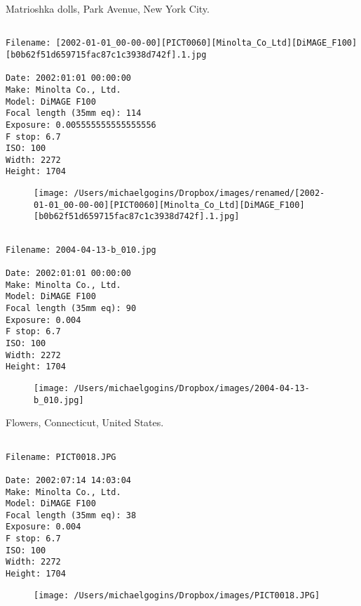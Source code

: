 \clearpage
\onecolumn
\noindent Matrioshka dolls, Park Avenue, New York City.
\noindent
\begin{lstlisting}

Filename: [2002-01-01_00-00-00][PICT0060][Minolta_Co_Ltd][DiMAGE_F100][b0b62f51d659715fac87c1c3938d742f].1.jpg

Date: 2002:01:01 00:00:00
Make: Minolta Co., Ltd.
Model: DiMAGE F100
Focal length (35mm eq): 114
Exposure: 0.005555555555555556
F stop: 6.7
ISO: 100
Width: 2272
Height: 1704
\end{lstlisting}
\clearpage

\begin{figure}
\texttt{[image: /Users/michaelgogins/Dropbox/images/renamed/[2002-01-01\_00-00-00][PICT0060][Minolta\_Co\_Ltd][DiMAGE\_F100][b0b62f51d659715fac87c1c3938d742f].1.jpg]}
\end{figure}
    
\clearpage
\onecolumn
\noindent 
\noindent
\begin{lstlisting}

Filename: 2004-04-13-b_010.jpg

Date: 2002:01:01 00:00:00
Make: Minolta Co., Ltd.
Model: DiMAGE F100
Focal length (35mm eq): 90
Exposure: 0.004
F stop: 6.7
ISO: 100
Width: 2272
Height: 1704
\end{lstlisting}
\clearpage

\begin{figure}
\texttt{[image: /Users/michaelgogins/Dropbox/images/2004-04-13-b\_010.jpg]}
\end{figure}
    
\clearpage
\onecolumn
\noindent Flowers, Connecticut, United States.
\noindent
\begin{lstlisting}

Filename: PICT0018.JPG

Date: 2002:07:14 14:03:04
Make: Minolta Co., Ltd.
Model: DiMAGE F100
Focal length (35mm eq): 38
Exposure: 0.004
F stop: 6.7
ISO: 100
Width: 2272
Height: 1704
\end{lstlisting}
\clearpage

\begin{figure}
\texttt{[image: /Users/michaelgogins/Dropbox/images/PICT0018.JPG]}
\end{figure}
    

